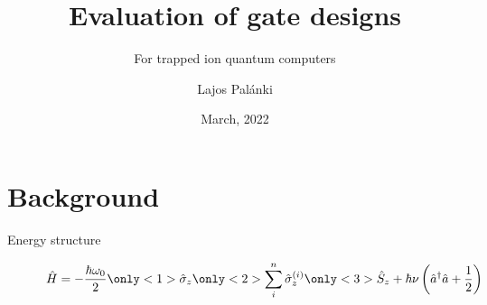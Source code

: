 \documentclass[aspectratio=169]{beamer}
\title{Evaluation of gate designs} %
\subtitle{For trapped ion quantum computers}
\author[L. Pal\' anki]{Lajos Pal\' anki}
\institute[ICL]{
    Department of Physics%
    \\%
    Imperial College London%
} %
\date{March, 2022}
\begin{document}
    
    \frame{\titlepage}
    
    
    
    
    
    \section{Background}
	\begin{frame}{Energy structure}
		\begin{figure}
			\centering
			\[\hat{H}=-\frac{\hbar\omega_0}{2}\only<1>{\hat{\sigma}_z}\only<2>{\sum_i^n\hat{\sigma}_z^{(i)}}\only<3>{\hat{S}_z}+ \hbar\nu \left(\hat{a}^\dagger\hat{a} + \frac{1}{2}\right)\]
		\end{figure}
	\end{frame}
\end{document}

